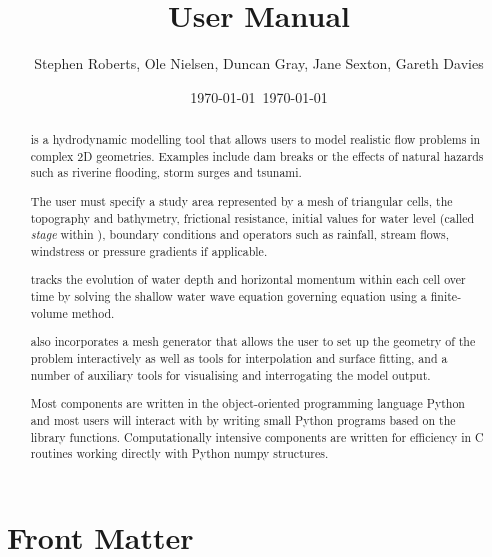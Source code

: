 \documentclass{manual}
\title{\anuga User Manual}
\author{Stephen Roberts, Ole Nielsen, Duncan Gray, Jane Sexton, Gareth Davies}
\date{\today \ \currenttime}
\date{\today} %
\begin{document}
\maketitle

\ifhtml
  \chapter*{Front Matter\label{front}}
\fi

%



\begin{abstract}
\label{def:anuga}

\noindent \anuga\index{\anuga} is a hydrodynamic modelling tool that
allows users to model realistic flow problems in complex 2D geometries.
Examples include dam breaks or the effects of natural hazards such
as riverine flooding, storm surges and tsunami.

The user must specify a study area represented by a mesh of triangular
cells, the topography and bathymetry, frictional resistance, initial
values for water level (called \emph{stage} within \anuga),
boundary conditions and operators such as rainfall, 
stream flows, windstress or pressure gradients if applicable.

\anuga tracks the evolution of water depth and horizontal momentum
within each cell over time by solving the shallow water wave equation
governing equation using a finite-volume method.

\anuga also incorporates a mesh generator that
allows the user to set up the geometry of the problem interactively as
well as tools for interpolation and surface fitting, and a number of
auxiliary tools for visualising and interrogating the model output.

Most \anuga components are written in the object-oriented programming
language Python and most users will interact with \anuga by writing
small Python programs based on the \anuga library
functions. Computationally intensive components are written for
efficiency in C routines working directly with Python numpy structures.

\end{abstract}

\tableofcontents
\end{document}
